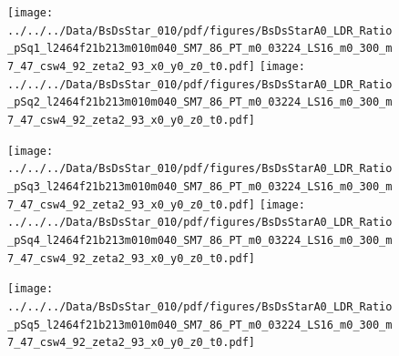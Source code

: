 \documentclass[a4paper,10pt]{article}
\begin{document}
\begin{figure}[p]
 \texttt{[image: ../../../Data/BsDsStar\_010/pdf/figures/BsDsStarA0\_LDR\_Ratio\_pSq1\_l2464f21b213m010m040\_SM7\_86\_PT\_m0\_03224\_LS16\_m0\_300\_m7\_47\_csw4\_92\_zeta2\_93\_x0\_y0\_z0\_t0.pdf]} 
 \texttt{[image: ../../../Data/BsDsStar\_010/pdf/figures/BsDsStarA0\_LDR\_Ratio\_pSq2\_l2464f21b213m010m040\_SM7\_86\_PT\_m0\_03224\_LS16\_m0\_300\_m7\_47\_csw4\_92\_zeta2\_93\_x0\_y0\_z0\_t0.pdf]} 
 \end{figure}
\clearpage
\begin{figure}[p]
 \texttt{[image: ../../../Data/BsDsStar\_010/pdf/figures/BsDsStarA0\_LDR\_Ratio\_pSq3\_l2464f21b213m010m040\_SM7\_86\_PT\_m0\_03224\_LS16\_m0\_300\_m7\_47\_csw4\_92\_zeta2\_93\_x0\_y0\_z0\_t0.pdf]} 
 \texttt{[image: ../../../Data/BsDsStar\_010/pdf/figures/BsDsStarA0\_LDR\_Ratio\_pSq4\_l2464f21b213m010m040\_SM7\_86\_PT\_m0\_03224\_LS16\_m0\_300\_m7\_47\_csw4\_92\_zeta2\_93\_x0\_y0\_z0\_t0.pdf]} 
 \end{figure}
\begin{figure}[p]
 \texttt{[image: ../../../Data/BsDsStar\_010/pdf/figures/BsDsStarA0\_LDR\_Ratio\_pSq5\_l2464f21b213m010m040\_SM7\_86\_PT\_m0\_03224\_LS16\_m0\_300\_m7\_47\_csw4\_92\_zeta2\_93\_x0\_y0\_z0\_t0.pdf]} 
 \end{figure}
\clearpage
\end{document}

